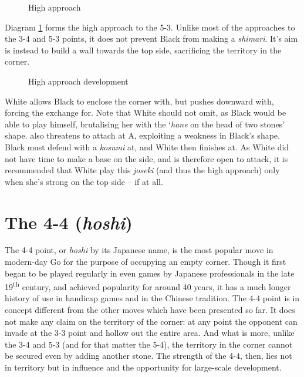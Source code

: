 \documentclass[a5paper,12pt,twoside]{book} %
\newcounter{joseki}                 %
\newcommand{\dref}[1]{Diagram \ref{#1}}
\newcommand{\addstufftotoc}[2][toc]{%
  \addtocontents{#1}{#2}}
\begin{document}
\begin{figure}[!htbp]
 
\vspace{-0.6cm}\caption{High approach}
\label{5-3:high-approach}
\end{figure}

\dref{5-3:high-approach} forms the high approach to the 5-3. Unlike most of the approaches to the 3-4 and 5-3 points, it does not prevent Black from making a \textit{shimari}. It's aim is instead to build a wall towards the top side, sacrificing the territory in the corner.\\

\begin{figure}[!htbp]
 
\vspace{-0.6cm}\caption{High approach development}
\label{5-3:high-approach-dev}
\end{figure}

White allows Black to enclose the corner with{\large\blackstone[2]}, but pushes downward with{\large\whitestone[3]}, forcing the exchange{\large\blackstone[4]} for{\large\whitestone[5]}. Note that White should not omit{\large\whitestone[5]}, as Black would be able to play{\large\blackstone[5]} himself, brutalising her with the `\textit{hane} on the head of two stones' shape.{\large\whitestone[5]} also threatens to attach at A, exploiting a weakness in Black's shape. Black must defend with a \textit{kosumi} at{\large\blackstone[6]}, and White then finishes at{\large\whitestone[7]}. As White did not have time to make a base on the side, and is therefore open to attack, it is recommended that White play this \textit{joseki} (and thus the high approach) only when she's strong on the top side – if at all.\\
\addstufftotoc{\nobreak\smallskip\protect\par}

\chapter{The 4-4 (\textit{hoshi}) \label{sec:4-4}}

The 4-4 point, or \textit{hoshi} by its Japanese name, is the most popular move in modern-day Go for the purpose of occupying an empty corner. Though it first began to be played regularly in even games by Japanese professionals in the late 19\textsuperscript{th} century, and achieved popularity for around 40 years, it has a much longer history of use in handicap games and in the Chinese tradition. The 4-4 point is in concept different from the other moves which have been presented so far. It does not make any claim on the territory of the corner: at any point the opponent can invade at the 3-3 point and hollow out the entire area. And what is more, unlike the 3-4 and 5-3 (and for that matter the 5-4), the territory in the corner cannot be secured even by adding another stone. The strength of the 4-4, then, lies not in territory but in influence and the opportunity for large-scale development.\\
\end{document}
